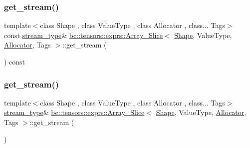 \mbox{\label{classbc_1_1tensors_1_1exprs_1_1Array__Slice_a739a989a4218cc756e1cc60ea9560ecf}} 
\subsubsection{\texorpdfstring{get\+\_\+stream()}{get\_stream()}\hspace{0.1cm}{\footnotesize\ttfamily [1/2]}}
{\footnotesize\ttfamily template$<$class Shape , class Value\+Type , class Allocator , class... Tags$>$ \\
const \hyperlink{classbc_1_1tensors_1_1exprs_1_1Array__Slice_a73ab693dcce17b3bf37747b2e91a2fb2}{stream\+\_\+type}\& \hyperlink{classbc_1_1tensors_1_1exprs_1_1Array__Slice}{bc\+::tensors\+::exprs\+::\+Array\+\_\+\+Slice}$<$ \hyperlink{structbc_1_1Shape}{Shape}, Value\+Type, \hyperlink{classbc_1_1allocators_1_1Allocator}{Allocator}, Tags $>$\+::get\+\_\+stream (\begin{DoxyParamCaption}{ }\end{DoxyParamCaption}) const\hspace{0.3cm}{\ttfamily [inline]}}

\mbox{\label{classbc_1_1tensors_1_1exprs_1_1Array__Slice_a9dda2d0d35e3dbee9d56883ace9256df}} 
\subsubsection{\texorpdfstring{get\+\_\+stream()}{get\_stream()}\hspace{0.1cm}{\footnotesize\ttfamily [2/2]}}
{\footnotesize\ttfamily template$<$class Shape , class Value\+Type , class Allocator , class... Tags$>$ \\
\hyperlink{classbc_1_1tensors_1_1exprs_1_1Array__Slice_a73ab693dcce17b3bf37747b2e91a2fb2}{stream\+\_\+type}\& \hyperlink{classbc_1_1tensors_1_1exprs_1_1Array__Slice}{bc\+::tensors\+::exprs\+::\+Array\+\_\+\+Slice}$<$ \hyperlink{structbc_1_1Shape}{Shape}, Value\+Type, \hyperlink{classbc_1_1allocators_1_1Allocator}{Allocator}, Tags $>$\+::get\+\_\+stream (\begin{DoxyParamCaption}{ }\end{DoxyParamCaption})\hspace{0.3cm}{\ttfamily [inline]}}




